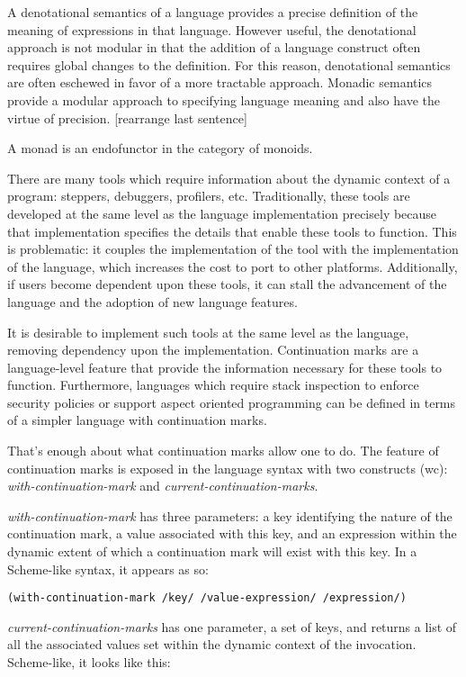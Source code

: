 \documentclass[ms]{byuprop}
\begin{document}
A denotational semantics of a language provides a precise definition of the meaning of expressions in that language. However useful, the denotational approach is not modular in that the addition of a language construct often requires global changes to the definition. For this reason, denotational semantics are often eschewed in favor of a more tractable approach. Monadic semantics provide a modular approach to specifying language meaning and also have the virtue of precision. [rearrange last sentence]

A monad is an endofunctor in the category of monoids.

There are many tools which require information about the dynamic context of a program: steppers, debuggers, profilers, etc. Traditionally, these tools are developed at the same level as the language implementation precisely because that implementation specifies the details that enable these tools to function. This is problematic: it couples the implementation of the tool with the implementation of the language, which increases the cost to port to other platforms. Additionally, if users become dependent upon these tools, it can stall the advancement of the language and the adoption of new language features.

It is desirable to implement such tools at the same level as the language, removing dependency upon the implementation. Continuation marks are a language-level feature that provide the information necessary for these tools to function. Furthermore, languages which require stack inspection to enforce security policies or support aspect oriented programming can be defined in terms of a simpler language with continuation marks.

That's enough about what continuation marks allow one to do. The feature of continuation marks is exposed in the language syntax with two constructs (wc): \emph{with-continuation-mark} and \emph{current-continuation-marks}.

\emph{with-continuation-mark} has three parameters: a key identifying the nature of the continuation mark, a value associated with this key, and an expression within the dynamic extent of which a continuation mark will exist with this key. In a Scheme-like syntax, it appears as so:

\begin{verbatim}
(with-continuation-mark /key/ /value-expression/ /expression/)
\end{verbatim}

\emph{current-continuation-marks} has one parameter, a set of keys, and returns a list of all the associated values set within the dynamic context of the invocation. Scheme-like, it looks like this:
\end{document}
